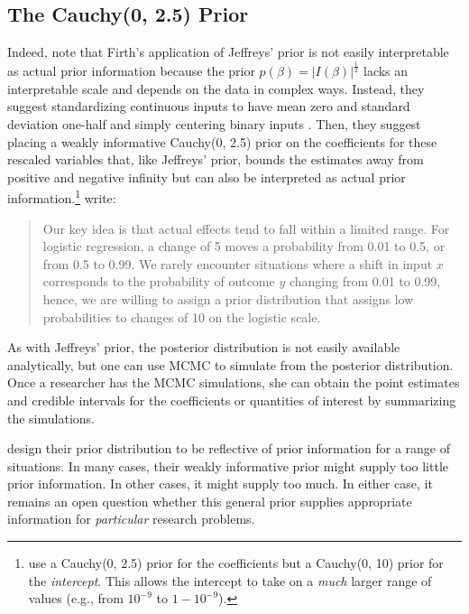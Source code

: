 \documentclass[12pt]{article}
\begin{document}
\subsection*{The Cauchy(0, 2.5) Prior}

Indeed, \cite{Gelmanetal2008} note that Firth's application of Jeffreys' prior is not easily interpretable as actual prior information because the prior $p(\beta) = |I(\beta)|^\frac{1}{2}$ lacks an interpretable scale and depends on the data in complex ways. 
Instead, they suggest standardizing continuous inputs to have mean zero and standard deviation one-half and simply centering binary inputs \citep{Gelman2008}. 
Then, they suggest placing a weakly informative Cauchy(0, 2.5) prior on the coefficients for these rescaled variables that, like Jeffreys' prior, bounds the estimates away from positive and negative infinity but can also be interpreted as actual prior information.\footnote{
\cite{Gelmanetal2008} use a Cauchy(0, 2.5) prior for the coefficients but a Cauchy(0, 10) prior for the \emph{intercept}. 
This allows the intercept to take on a \emph{much} larger range of values (e.g., from $10^{-9}$ to $1 - 10^{-9}$).} 
\citet[p. 1363]{Gelmanetal2008} write:
\begin{quote}
Our key idea is that actual effects tend to fall within a limited range. For logistic regression, a change of 5 moves a probability from 0.01 to 0.5, or from 0.5 to 0.99. We rarely encounter situations where a shift in input $x$ corresponds to the probability of outcome $y$ changing from 0.01 to 0.99, hence, we are willing to assign a prior distribution that assigns low probabilities to changes of 10 on the logistic scale.
\end{quote}

As with Jeffreys' prior, the posterior distribution is not easily available analytically, but one can use MCMC to simulate from the posterior distribution. 
Once a researcher has the MCMC simulations, she can obtain the point estimates and credible intervals for the coefficients or quantities of interest by summarizing the simulations. 

\cite{Gelmanetal2008} design their prior distribution to be reflective of prior information for a range of situations. 
In many cases, their weakly informative prior might supply too little prior information. 
In other cases, it might supply too much. 
In either case, it remains an open question whether this general prior supplies appropriate information for \emph{particular} research problems.
\end{document}
